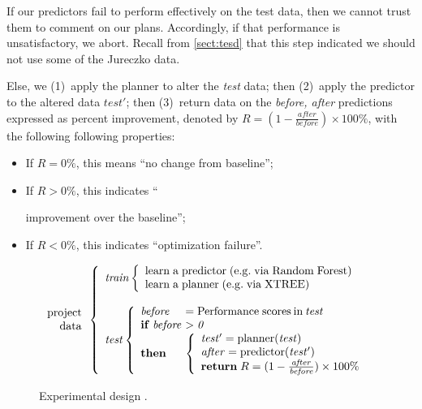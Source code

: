 \documentclass{sig-alternate}
\newcommand{\bi}{\begin{itemize}}
\newcommand{\ei}{\end{itemize}}
\newcommand{\tion}[1]{\textsection\ref{sect:#1}}
\begin{document}
If our { predictors} fail to perform effectively on the test data,
then we cannot trust them to comment on our plans. Accordingly,
if that performance is unsatisfactory, we abort. Recall from \tion{tesd} that this step indicated
we should not use some of the  Jureczko data.

Else, we (1)~apply the { planner} to alter the {\em test} data;
then (2)~apply the { predictor} to the altered data $test'$;
then (3)~return data on the {\em before, after} predictions expressed as percent improvement, denoted by  $R=(1-\frac{\mathit{after}}{\mathit{before}})\times100\%$, with the following following properties:
\bi
\item If $R  = 0\%$, this means  ``no change from baseline''; 
\item If $R \gt 0\%$, this indicates ``

improvement over the baseline'';
\item If $R \lt 0\%$, this indicates ``optimization failure''.
\ei

\begin{figure}[!t]
{\small 
\[
\begin{array}{r} 
\mathrm{project}\\
\mathrm{data}
\end{array} 
\left\{\begin{array}{l}\mathit{train}
        \left\{\begin{array}{l}
                \mathrm{learn\;a\;}\mathrm{predictor\;}\mathrm{(e.g.\;via \;Random\;Forest)}\\
                \mathrm{learn\;a\;}\mathrm{planner\;}\mathrm{(e.g.\;via \; XTREE)}
              \end{array}\right.
       \\
      ~\\
\mathit{test}  
    \left\{\begin{array}{l@{~}l}
           \mathit{before}& =\mathrm{Performance\; scores \hspace{2pt} in \hspace{2pt}}\mathit{test}\\
           \mathrm{\bf if\;}\mathit{before} & >  \mathit{0}\\
           \mathrm{\bf then} &
           \left\{
            \begin{array}{l}
                \mathit{test'} = \mathrm{planner}(\mathit{test})\\
                \mathit{after} =\mathrm{predictor}(\mathit{test'})\\ 
                \mathrm{{\bf return}\;} R=(1-\frac{\mathit{after}}{\mathit{before}})\times 100 \%
            \end{array}
          \right.
   \end{array}\right.
\end{array} \right. 
\]}
 \caption{Experimental design .}\label{fig:design}
 \end{figure}
\end{document}

